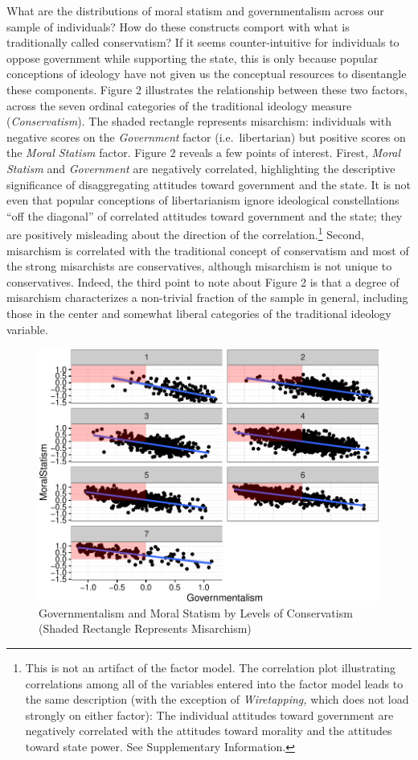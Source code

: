 \documentclass[12pt,]{article}
\let\rmarkdownfootnote\footnote%
\def\footnote{\protect\rmarkdownfootnote}
\begin{document}
What are the distributions of moral statism and governmentalism across
our sample of individuals? How do these constructs comport with what is
traditionally called conservatism? If it seems counter-intuitive for
individuals to oppose government while supporting the state, this is
only because popular conceptions of ideology have not given us the
conceptual resources to disentangle these components. Figure 2
illustrates the relationship between these two factors, across the seven
ordinal categories of the traditional ideology measure
(\emph{Conservatism}). The shaded rectangle represents misarchism:
individuals with negative scores on the \emph{Government} factor
(i.e.~libertarian) but positive scores on the \emph{Moral Statism}
factor. Figure 2 reveals a few points of interest. Firest, \emph{Moral
Statism} and \emph{Government} are negatively correlated, highlighting
the descriptive significance of disaggregating attitudes toward
government and the state. It is not even that popular conceptions of
libertarianism ignore ideological constellations ``off the diagonal'' of
correlated attitudes toward government and the state; they are
positively misleading about the direction of the correlation.\footnote{This
  is not an artifact of the factor model. The correlation plot
  illustrating correlations among all of the variables entered into the
  factor model leads to the same description (with the exception of
  \emph{Wiretapping,} which does not load strongly on either factor):
  The individual attitudes toward government are negatively correlated
  with the attitudes toward morality and the attitudes toward state
  power. See Supplementary Information.} Second, misarchism is
correlated with the traditional concept of conservatism and most of the
strong misarchists are conservatives, although misarchism is not unique
to conservatives. Indeed, the third point to note about Figure 2 is that
a degree of misarchism characterizes a non-trivial fraction of the
sample in general, including those in the center and somewhat liberal
categories of the traditional ideology variable.

\begin{figure}[htbp]
\centering
\includegraphics{figures/exploratoryplot-1.pdf}
\caption{Governmentalism and Moral Statism by Levels of Conservatism
(Shaded Rectangle Represents Misarchism)}
\end{figure}
\end{document}
